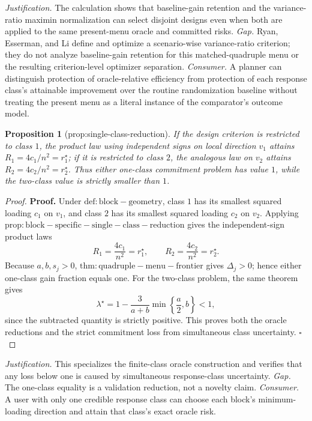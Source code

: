 \documentclass{article}
\newtheorem{proposition}{Proposition}
\begin{document}
\par\smallskip\noindent \textit{Justification.} The calculation shows that baseline-gain retention and the variance-ratio maximin normalization can select disjoint designs even when both are applied to the same present-menu oracle and committed risks. \textit{Gap.} Ryan, Esserman, and Li define and optimize a scenario-wise variance-ratio criterion; they do not analyze baseline-gain retention for this matched-quadruple menu or the resulting criterion-level optimizer separation. \textit{Consumer.} A planner can distinguish protection of oracle-relative efficiency from protection of each response class's attainable improvement over the routine randomization baseline without treating the present menu as a literal instance of the comparator's outcome model.


\begin{proposition}[prop:single-class-reduction]\label{prop:single-class-reduction}
If the design criterion is restricted to class \(1\), the product law using independent signs on local direction \(v_1\) attains \(R_1=4c_1/n^2=r_1^\star\); if it is restricted to class \(2\), the analogous law on \(v_2\) attains \(R_2=4c_2/n^2=r_2^\star\). Thus either one-class commitment problem has value \(1\), while the two-class value is strictly smaller than \(1\).
\end{proposition}
\begin{proof}
\textbf{Proof.}
Under \(\mathrm{def:block-geometry}\), class \(1\) has its smallest squared loading \(c_1\) on \(v_1\), and class \(2\) has its smallest squared loading \(c_2\) on \(v_2\).  Applying \(\mathrm{prop:block-specific-single-class-reduction}\) gives the independent-sign product laws
\[
R_1=\frac{4c_1}{n^2}=r_1^\star,
\qquad
R_2=\frac{4c_2}{n^2}=r_2^\star. \tag{1}
\]
Because \(a,b,s_j>0\), \(\mathrm{thm:quadruple-menu-frontier}\) gives \(\Delta_j>0\); hence either one-class gain fraction equals one.  For the two-class problem, the same theorem gives
\[
\lambda^\star
=1-\frac3{a+b}\min\left\{\frac a2,b\right\}<1, \tag{2}
\]
since the subtracted quantity is strictly positive.  This proves both the oracle reductions and the strict commitment loss from simultaneous class uncertainty. \(\square\)
\end{proof}
\par\smallskip\noindent \textit{Justification.} This specializes the finite-class oracle construction and verifies that any loss below one is caused by simultaneous response-class uncertainty. \textit{Gap.} The one-class equality is a validation reduction, not a novelty claim. \textit{Consumer.} A user with only one credible response class can choose each block's minimum-loading direction and attain that class's exact oracle risk.
\end{document}
